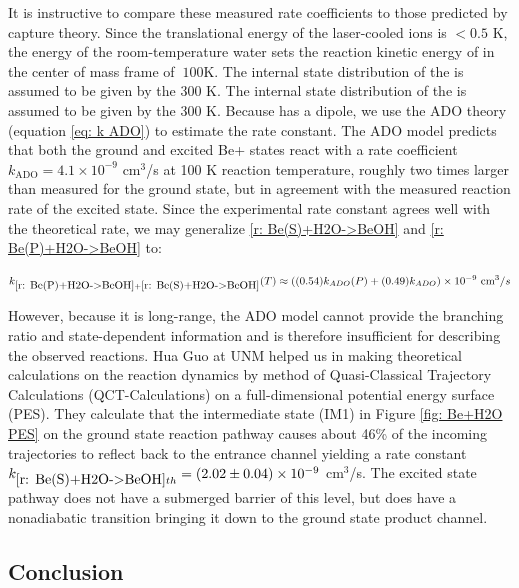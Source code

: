 It is instructive to compare these measured rate coefficients to those predicted by capture theory. Since the translational energy of the laser-cooled  ions is $<0.5$ K, the energy of the room-temperature water sets the reaction kinetic energy of  in the center of mass frame of $~100$K. The internal state distribution of the  is assumed to be given by the 300 K. The internal state distribution of the  is assumed to be given by the 300 K. Because  has a dipole, we use the ADO theory (equation \ref{eq: k ADO}) to estimate the rate constant. The ADO model predicts that both the ground and excited Be+ states react with a rate coefficient $k_{\text{ADO}} = 4.1 \times 10^{-9}$ cm$^3$/s at 100 K reaction temperature, roughly two times larger than measured for the ground state, but in agreement with the measured reaction rate of the excited state. Since the experimental rate constant agrees well with the theoretical rate, we may generalize \ref{r: Be(S)+H2O->BeOH} and \ref{r: Be(P)+H2O->BeOH} to:

\begin{equation}
	k_{\ref{r: Be(P)+H2O->BeOH}+\ref{r: Be(S)+H2O->BeOH}}(T) \approx ((0.54)k_{ADO}(P) + (0.49)k_{ADO}) \times 10^{-9}\text{ cm}^3/s
	\label{eq: k Be+H2O(T)}
\end{equation}

However, because it is long-range, the ADO model cannot provide the branching ratio and state-dependent information and is therefore insufficient for describing the observed reactions. Hua Guo at UNM helped us in making theoretical calculations on the reaction dynamics by method of Quasi-Classical Trajectory Calculations (QCT-Calculations) on a full-dimensional potential energy surface (PES).\cite{Yang2018} They calculate that the intermediate state (IM1) in Figure \ref{fig: Be+H2O PES} on the ground state reaction pathway causes about 46\% of the incoming trajectories to reflect back to the entrance channel yielding a rate constant $k_{\ref{r: Be(S)+H2O->BeOH} th} = (2.02 \pm 0.04) \times 10^{-9}$ cm$^3$/s. The excited state pathway does not have a submerged barrier of this level, but does have a nonadiabatic transition bringing it down to the ground state product channel.

\subsection{Conclusion}

